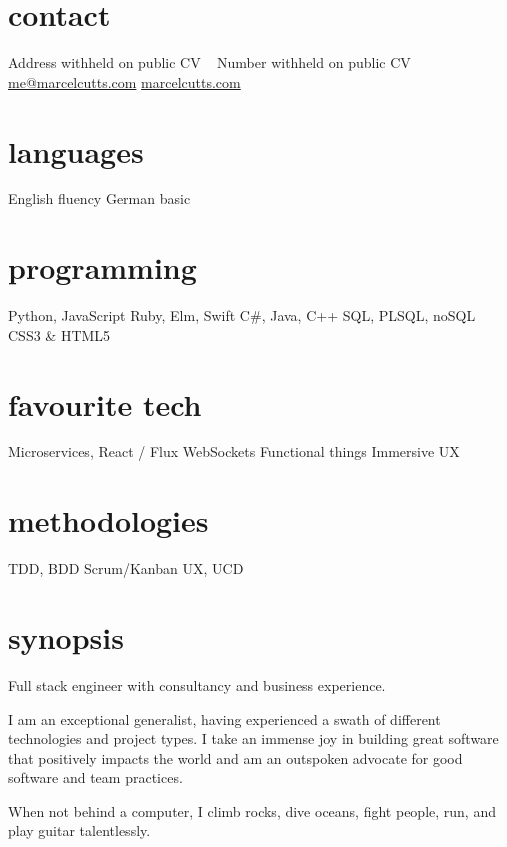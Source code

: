 \documentclass[]{friggeri-cv} %
\begin{document}


\begin{aside} %
\section{contact}
Address withheld on public CV
~
Number withheld on public CV
~
\href{mailto:me@marcelcutts.com}{me@marcelcutts.com}
\href{http://www.marcelcutts.com}{marcelcutts.com}
\section{languages}
English fluency
German basic
\section{programming}
Python, JavaScript
Ruby, Elm, Swift
C\#, Java, C++
SQL, PLSQL, noSQL
CSS3 \& HTML5
\section{favourite tech}
Microservices,
React / Flux
WebSockets
Functional things
Immersive UX
\section{methodologies}
TDD, BDD
Scrum/Kanban
UX, UCD
\end{aside}


\section{synopsis}

Full stack engineer with consultancy and business experience.

I am an exceptional generalist, having experienced a swath of different technologies and project types. I take an immense joy in building great software that positively impacts the world and am an outspoken advocate for good software and team practices.

When not behind a computer, I climb rocks, dive oceans, fight people, run, and play guitar talentlessly.
\end{document}
